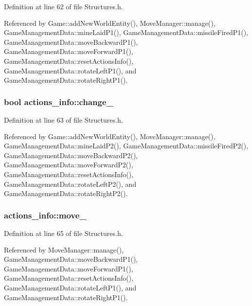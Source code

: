 Definition at line 62 of file Structures.\-h.



Referenced by Game\-::add\-New\-World\-Entity(), Move\-Manager\-::manage(), Game\-Management\-Data\-::mine\-Laid\-P1(), Game\-Management\-Data\-::missile\-Fired\-P1(), Game\-Management\-Data\-::move\-Backward\-P1(), Game\-Management\-Data\-::move\-Forward\-P1(), Game\-Management\-Data\-::reset\-Actions\-Info(), Game\-Management\-Data\-::rotate\-Left\-P1(), and Game\-Management\-Data\-::rotate\-Right\-P1().

\hypertarget{structactions__info_a0f20d9c244d92a71dad9cf8ce10cd2f2}{
\subsubsection[{change\-\_\-2}]{\setlength{\rightskip}{0pt plus 5cm}bool actions\-\_\-info\-::change\-\_}}\label{structactions__info_a0f20d9c244d92a71dad9cf8ce10cd2f2}


Definition at line 63 of file Structures.\-h.



Referenced by Game\-::add\-New\-World\-Entity(), Move\-Manager\-::manage(), Game\-Management\-Data\-::mine\-Laid\-P2(), Game\-Management\-Data\-::missile\-Fired\-P2(), Game\-Management\-Data\-::move\-Backward\-P2(), Game\-Management\-Data\-::move\-Forward\-P2(), Game\-Management\-Data\-::reset\-Actions\-Info(), Game\-Management\-Data\-::rotate\-Left\-P2(), and Game\-Management\-Data\-::rotate\-Right\-P2().

\hypertarget{structactions__info_a5cb853144009b2bfb7e58c7bf43e2a42}{
\subsubsection[{move\-\_\-1}]{ actions\-\_\-info\-::move\-\_}}\label{structactions__info_a5cb853144009b2bfb7e58c7bf43e2a42}


Definition at line 65 of file Structures.\-h.



Referenced by Move\-Manager\-::manage(), Game\-Management\-Data\-::move\-Backward\-P1(), Game\-Management\-Data\-::move\-Forward\-P1(), Game\-Management\-Data\-::reset\-Actions\-Info(), Game\-Management\-Data\-::rotate\-Left\-P1(), and Game\-Management\-Data\-::rotate\-Right\-P1().

